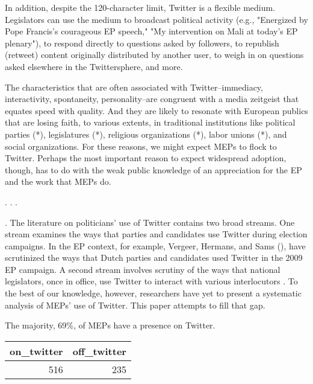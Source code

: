 \documentclass{article}\usepackage[]{graphicx}\usepackage[]{color}
\begin{document}
	In addition, despite the 120-character limit, Twitter is a flexible medium. Legislators can use the medium to broadcast political activity (e.g., "Energized by Pope Francis's courageous EP speech," "My intervention on Mali at today's EP plenary"), to respond directly to questions asked by followers, to republish (retweet) content originally distributed by another user, to weigh in on questions asked elsewhere in the Twittersphere, and more. 

	The characteristics that are often associated with Twitter--immediacy, interactivity, spontaneity, personality--are congruent with a media zeitgeist that equates speed with quality. And they are likely to resonate with European publics that are losing faith, to various extents, in traditional institutions like political parties (*), legislatures (*), religious organizations (*), labor unions (*), and social organizations. For these reasons, we might expect MEPs to flock to Twitter.  Perhaps the most important reason to expect widespread adoption, though, has to do with the weak public knowledge of an appreciation for the EP and the work that MEPs do.
	
	. . .
		

. The literature on politicians' use of Twitter contains two broad streams. One stream examines the ways that parties and candidates use Twitter during election campaigns. In the EP context, for example, Vergeer, Hermans, and Sams (\citeyear{vergeer.hermans.sams.2011,vergeer.hermans.sams.2013}), have scrutinized the ways that Dutch parties and candidates used Twitter in the 2009 EP campaign. A second stream involves scrutiny of the ways that national legislators, once in office, use Twitter to interact with various interlocutors \citep*{ausserhofer.maireder.2013, chi.yang.2010, glass man.strauss.shogan.2013, larsson.kalsnes.2014, peterson.2012, shogun.2010, williams.gulati.2010}. To the best of our knowledge, however, researchers have yet to present a systematic analysis of MEPs' use of Twitter. This paper attempts to fill that gap.





The majority, 69\%, of MEPs have a presence on Twitter. 
\begin{table}[ht]
\centering
\begin{tabular}{rr}
  \hline
on\_twitter & off\_twitter \\ 
  \hline
516 & 235 \\ 
   \hline
\end{tabular}
\end{table}
\end{document}
